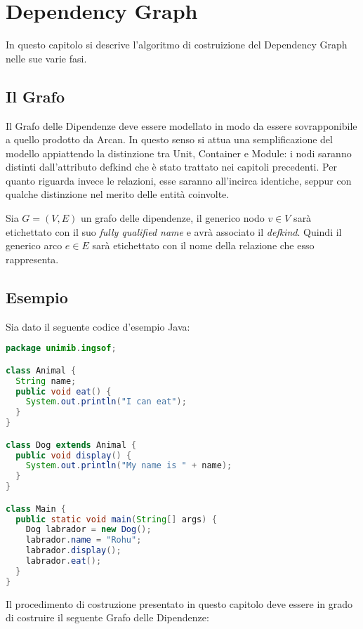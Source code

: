 \chapter{Dependency Graph}

In questo capitolo si descrive l'algoritmo di costruizione del Dependency Graph nelle sue varie fasi.

\section{Il Grafo}

Il Grafo delle Dipendenze deve essere modellato in modo da essere sovrapponibile a quello prodotto da Arcan.
In questo senso si attua una semplificazione del modello appiattendo la distinzione tra Unit, Container e Module: i nodi saranno distinti dall'attributo defkind che \`e stato trattato nei capitoli precedenti.
Per quanto riguarda invece le relazioni, esse saranno all'incirca identiche, seppur con qualche distinzione nel merito delle entit\`a coinvolte.

Sia $G = (V, E)$ un grafo delle dipendenze, il generico nodo $v \in V$ sar\`a etichettato con il suo \emph{fully qualified name} e avr\`a associato il \emph{defkind}.
Quindi il generico arco $e \in E$ sar\`a etichettato con il nome della relazione che esso rappresenta.

\section{Esempio}

Sia dato il seguente codice d'esempio Java:

\begin{lstlisting}[language=Java]
package unimib.ingsof;

class Animal {
  String name;
  public void eat() {
    System.out.println("I can eat");
  }
}

class Dog extends Animal {
  public void display() {
    System.out.println("My name is " + name);
  }
}

class Main {
  public static void main(String[] args) {
    Dog labrador = new Dog();
    labrador.name = "Rohu";
    labrador.display();
    labrador.eat();
  }
}
\end{lstlisting}

Il procedimento di costruzione presentato in questo capitolo deve essere in grado di costruire il seguente Grafo delle Dipendenze:


